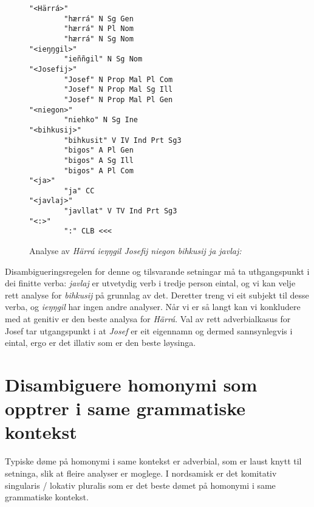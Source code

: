 \documentclass[a4paper,nynorsk]{article}
\begin{document}
\begin{figure}[htbp]
\begin{center}
\begin{verbatim}
"<Härrá>"
        "hærrá" N Sg Gen
        "hærrá" N Pl Nom
        "hærrá" N Sg Nom
"<ieŋŋgil>"
        "ieññgil" N Sg Nom
"<Josefij>"
        "Josef" N Prop Mal Pl Com
        "Josef" N Prop Mal Sg Ill
        "Josef" N Prop Mal Pl Gen
"<niegon>"
        "niehko" N Sg Ine
"<bihkusij>"
        "bihkusit" V IV Ind Prt Sg3
        "bigos" A Pl Gen
        "bigos" A Sg Ill
        "bigos" A Pl Com
"<ja>"
        "ja" CC
"<javlaj>" 
        "javllat" V TV Ind Prt Sg3
"<:>"
        ":" CLB <<<
\end{verbatim}
\caption{Analyse av \textit{Härrá ieŋŋgil Josefij niegon bihkusij ja javlaj:}}
\label{engelanalyse}
\end{center}
\end{figure}

Disambigueringsregelen for denne og tilsvarande setningar må ta uthgangspunkt i dei finitte verba: \textit{javlaj} er utvetydig verb i tredje person eintal, og vi kan velje rett analyse for \textit{bihkusij} på grunnlag av det. Deretter treng vi eit subjekt til desse verba, og \textit{ieŋŋgil} har ingen andre analyser. Når vi er så langt kan vi konkludere med at genitiv er den beste analysa for \textit{Härrá}. Val av rett adverbialkasus for Josef tar utgangspunkt i at \textit{Josef} er eit eigennamn og dermed sannsynlegvis i eintal, ergo er det illativ som er den beste løysinga. %




\section{Disambiguere homonymi som opptrer i same grammatiske kontekst}



Typiske døme på homonymi i same kontekst er adverbial, som er laust knytt til setninga, slik at fleire analyser er moglege. I nordsamisk er det komitativ singularis / lokativ pluralis som er det beste dømet på homonymi i same grammatiske kontekst. %
\end{document}
